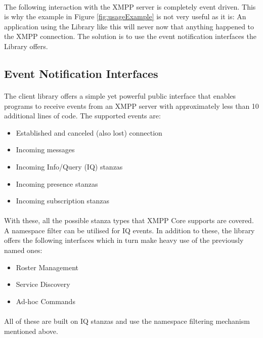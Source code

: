 \paragraph{}
The following interaction with the XMPP server is completely event driven. This is why the example in Figure \ref{fig:usageExample} is not very useful as it is: An application using the Library like this will never now that anything happened to the XMPP connection. The solution is to use the event notification interfaces the Library offers.

\subsection{Event Notification Interfaces}
\label{sec:interfaces}
\paragraph{}
The client library offers a simple yet powerful public interface that enables programs to receive events from an XMPP server with approximately less than 10 additional lines of code. The supported events are:
\begin{itemize}
\item Established and canceled (also lost) connection
\item Incoming messages
\item Incoming Info/Query (IQ) stanzas
\item Incoming presence stanzas
\item Incoming subscription stanzas
\end{itemize}
\paragraph{}
With these, all the possible stanza types that XMPP Core supports are covered. A namespace filter can be utilised for IQ events. In addition to these, the library offers the following interfaces which in turn make heavy use of the previously named ones:
\begin{itemize}
\item Roster Management
\item Service Discovery
\item Ad-hoc Commands
\end{itemize}
\paragraph{}
All of these are built on IQ stanzas and use the namespace filtering mechanism mentioned above.



